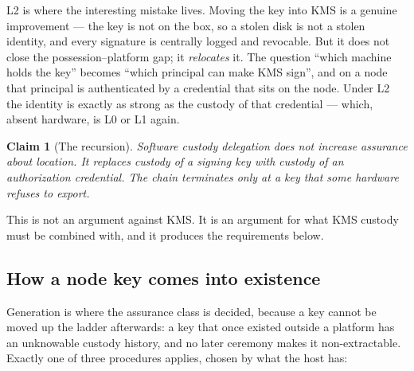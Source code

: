 \documentclass[11pt,a4paper]{article}
\newtheorem{claim}[definition]{Claim}
\begin{document}
L2 is where the interesting mistake lives. Moving the key into KMS is a genuine
improvement --- the key is not on the box, so a stolen disk is not a stolen
identity, and every signature is centrally logged and revocable. But it does not
close the possession--platform gap; it \emph{relocates} it. The question ``which
machine holds the key'' becomes ``which principal can make KMS sign'', and on a
node that principal is authenticated by a credential that sits on the node. Under
L2 the identity is exactly as strong as the custody of that credential --- which,
absent hardware, is L0 or L1 again.

\begin{claim}[The recursion]\label{cl:recursion}
Software custody delegation does not increase assurance about \emph{location}. It
replaces custody of a signing key with custody of an authorization credential.
The chain terminates only at a key that some hardware refuses to export.
\end{claim}

This is not an argument against KMS. It is an argument for what KMS custody must
be combined with, and it produces the requirements below.

\subsection{How a node key comes into existence}
\label{sec:gen}

Generation is where the assurance class is decided, because a key cannot be moved
up the ladder afterwards: a key that once existed outside a platform has an
unknowable custody history, and no later ceremony makes it non-extractable.
Exactly one of three procedures applies, chosen by what the host has:
\end{document}
